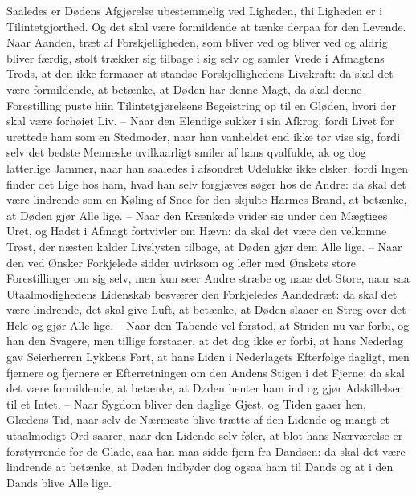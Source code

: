 \documentclass[12pt,a4paper]{article}
\begin{document}
Saaledes er Dødens Afgjørelse ubestemmelig ved Ligheden, thi Ligheden er i Tilintetgjorthed. Og det skal være formildende at tænke derpaa for den Levende. Naar Aanden, træt af Forskjelligheden, som bliver ved og bliver ved og aldrig bliver færdig, stolt trækker sig tilbage i sig selv og samler Vrede i Afmagtens Trods, at den ikke formaaer at standse Forskjellighedens Livskraft: da skal det være formildende, at betænke, at Døden har denne Magt, da skal denne Forestilling puste hiin Tilintetgjørelsens Begeistring op til en Gløden, hvori der skal være forhøiet Liv. – Naar den Elendige sukker i sin Afkrog, fordi Livet for urettede ham som en Stedmoder, naar han vanheldet end ikke tør vise sig, fordi selv det bedste Menneske uvilkaarligt smiler af hans qvalfulde, ak og dog latterlige Jammer, naar han saaledes i afsondret Udelukke ikke elsker, fordi Ingen finder det Lige hos ham, hvad han selv forgjæves søger hos de Andre: da skal det være lindrende som en Køling af Snee for den skjulte Harmes Brand, at betænke, at Døden gjør Alle lige. – Naar den Krænkede vrider sig under den Mægtiges Uret, og Hadet i Afmagt fortvivler om Hævn: da skal det være den velkomne Trøst, der næsten kalder Livslysten tilbage, at Døden gjør dem Alle lige. – Naar den ved Ønsker Forkjelede sidder uvirksom og lefler med Ønskets store Forestillinger om sig selv, men kun seer Andre stræbe og naae det Store, naar saa Utaalmodighedens Lidenskab besværer den Forkjeledes Aandedræt: da skal det være lindrende, det skal give Luft, at betænke, at Døden slaaer en Streg over det Hele og gjør Alle lige. – Naar den Tabende vel forstod, at Striden nu var forbi, og han den Svagere, men tillige forstaaer, at det dog ikke er forbi, at hans Nederlag gav Seierherren Lykkens Fart, at hans Liden i Nederlagets Efterfølge dagligt, men fjernere og fjernere er Efterretningen om den Andens Stigen i det Fjerne: da skal det være formildende, at betænke, at Døden henter ham ind og gjør Adskillelsen til et Intet. – Naar Sygdom bliver den daglige Gjest, og Tiden gaaer hen, Glædens Tid, naar selv de Nærmeste blive trætte af den Lidende og mangt et utaalmodigt Ord saarer, naar den Lidende selv føler, at blot hans Nærværelse er forstyrrende for de Glade, saa han maa sidde fjern fra Dandsen: da skal det være lindrende at betænke, at Døden indbyder dog ogsaa ham til Dands og at i den Dands blive Alle lige.
\end{document}
